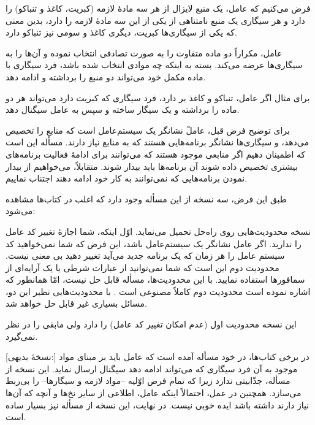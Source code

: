 \documentclass{book}
\begin{document}
    فرض می‌کنیم که عامل، یک منبع لایزال از هر سه مادهٔ لازمه (کبریت، کاغذ و تنباکو) را  دارد 
    و هر سیگاری یک منبع نامتناهی از یکی از این سه مادهٔ لازمه را دارد، 
    بدین معنی که یکی از سیگاری‌ها کبریت، دیگری کاغذ و سومی نیز تنباکو دارد. 

    عامل، مکراراً دو ماده متفاوت را به صورت تصادفی انتخاب نموده و آن‌ها را به سیگاری‌ها عرضه می‌کند. 
    بسته به اینکه چه موادی انتخاب شده باشد، فرد سیگاری با ماده مکمل خود می‌تواند دو منبع را برداشته و ادامه دهد. 

    برای مثال اگر عامل، تنباکو و کاغذ بر دارد، فرد سیگاری که کبریت دارد می‌تواند هر دو ماده را برداشته 
    و یک سیگار ساخته و سپس به عامل سیگنال دهد. 

    برای توضیح فرض قبل،‌    
    عاملْ نشانگر یک سیستم‌عامل است که منابع را تخصیص می‌دهد، و سیگاری‌ها نشانگر برنامه‌هایی هستند که به منابع نیاز دارند. 
    مسأله این است که اطمینان دهیم اگر منابعی موجود هستند 
    که می‌توانند برای ادامهٔ فعالیت برنامه‌های بیشتری تخصیص داده شوند آن برنامه‌ها باید بیدار شوند. 
    متقابلاً، می‌خواهیم از بیدار نمودن برنامه‌هایی که نمی‌توانند به کار خود ادامه دهند اجتناب نماییم. 


    طبق این فرض، سه نسخه از این مسأله وجود دارد که اغلب در کتاب‌ها مشاهده می‌شود: 

\begin{description}

\item
    [نسخهٔ غیرممکن:] نسخه  محدودیت‌هایی روی راه‌حل تحمیل می‌نماید. اوّل اینکه، شما اجازهٔ تغییر کد عامل را ندارید. 
    اگر عامل نشانگر یک سیستم‌عامل باشد، این فرض که شما نمی‌خواهید کد سیستم عامل را هر زمان که یک برنامه جدید می‌آید تغییر دهید 
    بی معنی نیست. 
    محدودیت دوم این است که شما نمی‌توانید از عبارات شرطی یا یک آرایه‌ای از سمافورها استفاده نمایید. با این محدودیت‌ها، 
    مسأله قابل حل نیست، امّا همانطور که   اشاره نموده است محدودیت دوم کاملاً مصنوعی است  \cite{Parnas}. 
    با محدودیت‌هایی نظیر این دو، مسائل بسیاری غیر قابل حل خواهد شد. 

\item
    [نسخهٔ جذّاب:] این نسخه محدودیت اول (عدم امکان تغییر کد عامل) را دارد ولی مابقی را در نظر نمی‌گیرد.
    
\item
    [نسخهٔ بدیهی:] در برخی کتاب‌ها، در خود مسأله آمده است که عامل باید بر مبنای مواد موجود به آن فرد سیگاری که 
    می‌تواند ادامه دهد سیگنال ارسال نماید. 
    این نسخه از مسأله، جذّابیتی ندارد زیرا که تمام فرض اوّلیه --مواد لازمه و سیگارها-- را بی‌ربط می‌سازد. همچنین در عمل، احتمالاً     
     اینکه عامل، اطلاعی از سایر نخ‌ها و آنچه که آن‌ها نیاز دارند داشته باشد ایده خوبی نیست. 
     در نهایت،  این نسخه از مسأله نیز بسیار ساده است.
     
\end{description}
\end{document}
